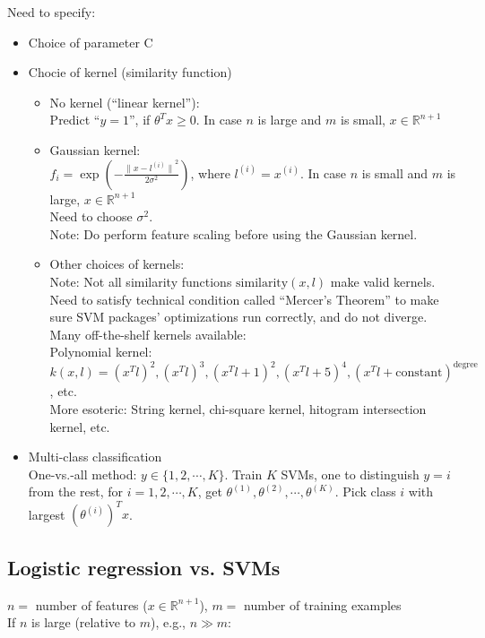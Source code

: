 Need to specify:
\begin{itemize}
\item
Choice of parameter C
\item
Chocie of kernel (similarity function)\\
\begin{itemize}
\item
No kernel (``linear kernel''):\\
Predict ``$y = 1$'', if $\theta^Tx \geq 0$. In case $n$ is large and $m$ is small, $x \in \mathbb{R}^{n+1}$
\item
Gaussian kernel:\\
$f_i = \exp{\left(-\frac{{\|x-l^{(i)}\|}^2}{2\sigma^2}\right)}$, where $l^{(i)} = x^{(i)}$. In case $n$ is small and $m$ is large, $x \in \mathbb{R}^{n+1}$\\
Need to choose $\sigma^2$.\\
Note: Do perform feature scaling before using the Gaussian kernel.\\
\item
Other choices of kernels:\\
Note: Not all similarity functions $\text{similarity}(x,l)$ make valid kernels. Need to satisfy technical condition called ``Mercer's Theorem'' to make sure SVM packages' optimizations run correctly, and do not diverge.\\
Many off-the-shelf kernels available:\\
Polynomial kernel: $k(x,l) = (x^Tl)^2, (x^Tl)^3, (x^Tl + 1)^2, (x^Tl + 5)^4, (x^Tl + \text{constant})^{\text{degree}}$, etc.\\
More esoteric: String kernel, chi-square kernel, hitogram intersection kernel, etc.
\end{itemize}
\item
Multi-class classification\\
One-vs.-all method: $y \in \{1, 2, \cdots, K\}$. Train $K$ SVMs, one to distinguish $y = i$ from the rest, for $i = 1, 2, \cdots, K$, get $\theta^{(1)}, \theta^{(2)}, \cdots, \theta^{(K)}$. Pick class $i$ with largest $(\theta^{(i)})^Tx$.
\end{itemize}

%
\subsection{Logistic regression vs. SVMs}
$n = $ number of features ($x \in \mathbb{R}^{n+1}$), $m = $ number of training examples\\
If $n$ is large (relative to $m$), e.g., $n \gg m$:

